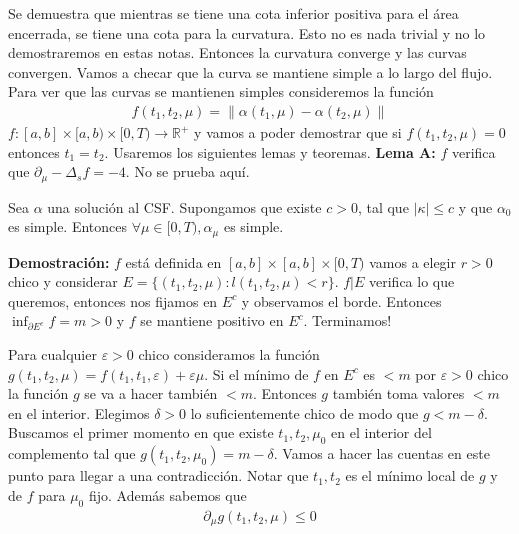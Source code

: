 \documentclass{article}
\theoremstyle{mytheoremstyle}
\theoremstyle{mytheoremstyle}
\theoremstyle{myproblemstyle}
\begin{document}
      Se demuestra que mientras se tiene una cota inferior positiva para el área encerrada, se tiene una cota para la curvatura. Esto no es nada trivial y no lo demostraremos en estas notas. Entonces la curvatura converge y las curvas convergen. Vamos a checar que la curva se mantiene simple a lo largo del flujo. Para ver que las curvas se mantienen simples consideremos la función 
      \begin{align}
        f(t_1,t_2, \mu)=\|\alpha(t_1,\mu)-\alpha(t_2,\mu)\|
      \end{align}
      $f:[a,b]\times[a,b)\times [0,T)\to \mathbb{R}^+$ y vamos a poder demostrar que si $f(t_1,t_2,\mu)=0$ entonces $t_1=t_2$. Usaremos los siguientes lemas y teoremas.
      \textbf{Lema A:} $f$ verifica que $\partial_\mu-\Delta_s f = -4 $. No se prueba aquí.
      \begin{theorem}[]
        Sea $\alpha$ una solución al CSF. Supongamos que existe $c>0$, tal que $|\kappa|\leq c$ y que $\alpha_0$ es simple. Entonces $\forall \mu \in [0,T), \alpha_\mu$ es simple.
      \end{theorem}
      \textbf{Demostración:} $f$ está definida en $[a,b]\times[a,b]\times [0,T)$ vamos a elegir $r>0$ chico y considerar  $E = \{(t_1,t_2,\mu): l(t_1,t_2,\mu) < r\}$. $f|E$ verifica lo que queremos, entonces nos fijamos en $E^c$ y observamos el borde. Entonces $\inf_{\partial E^c} f =m>0 $ y $f$ se mantiene positivo en $E^c$. Terminamos! 

      Para cualquier $\varepsilon> 0$ chico consideramos la función $g(t_1,t_2,\mu)= f(t_1,t_1,\varepsilon)+\varepsilon\mu$. Si el mínimo de $f$ en $E^c$ es $<m$ por $\varepsilon>0$ chico la función $g$ se va a hacer también $<m$. Entonces $g$ también toma valores $<m$ en el interior. Elegimos $\delta>0$ lo suficientemente chico de modo que $g< m-\delta $. Buscamos el primer momento en que existe $t_1,t_2,\mu_0$ en el interior del complemento tal que $g(t_1,t_2,\mu_0)=m-\delta$. 
      Vamos a hacer las cuentas en este punto para llegar a una contradicción. Notar que $t_1,t_2$ es el mínimo local de $g$ y de $f$ para $\mu_0$ fijo. Además sabemos que 
      \begin{align} \label{cont}
        \partial_\mu g (t_1,t_2,\mu) \leq 0 
      \end{align}
\end{document}
